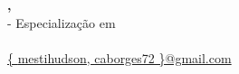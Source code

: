 \begin{center}
  \begin{singlespace}
  \Large{
    \titulo\\
    \subtitulo\\
  }
  \vspace*{.5cm}
    \normalsize{
      \textbf{
        \autor,
        \orientador\\
      }
    }
  \vspace*{.5cm}
  \small{
    \instituicao -
    Especialização em \formacao\\
    \instituicaoendereco\\
  }
  \vspace*{.5cm}
  {
    \ttfamily
    \footnotesize{
      \color{blue}
      \underline{
        \{
          \href{mailto:mestihudson@gmail.com}{mestihudson},
          \href{mailto:caborges72@gmail.com}{caborges72}
        \}@gmail.com
      }
    }
  }
  \end{singlespace}
\end{center}

